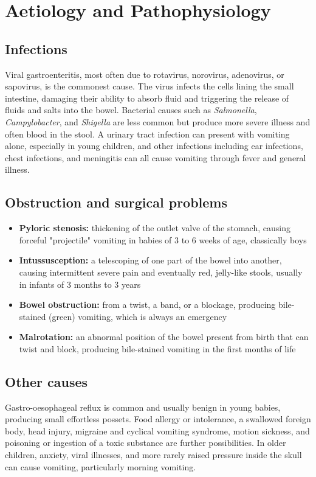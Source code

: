 \section*{Aetiology and Pathophysiology}
\subsection*{Infections}
Viral gastroenteritis, most often due to rotavirus, norovirus, adenovirus, or sapovirus, is the commonest cause. The virus infects the cells lining the small intestine, damaging their ability to absorb fluid and triggering the release of fluids and salts into the bowel. Bacterial causes such as \textit{Salmonella}, \textit{Campylobacter}, and \textit{Shigella} are less common but produce more severe illness and often blood in the stool. A urinary tract infection can present with vomiting alone, especially in young children, and other infections including ear infections, chest infections, and meningitis can all cause vomiting through fever and general illness.

\subsection*{Obstruction and surgical problems}
\begin{itemize}
    \item \textbf{Pyloric stenosis:} thickening of the outlet valve of the stomach, causing forceful "projectile" vomiting in babies of 3 to 6 weeks of age, classically boys
    \item \textbf{Intussusception:} a telescoping of one part of the bowel into another, causing intermittent severe pain and eventually red, jelly-like stools, usually in infants of 3 months to 3 years
    \item \textbf{Bowel obstruction:} from a twist, a band, or a blockage, producing bile-stained (green) vomiting, which is always an emergency
    \item \textbf{Malrotation:} an abnormal position of the bowel present from birth that can twist and block, producing bile-stained vomiting in the first months of life
\end{itemize}

\subsection*{Other causes}
Gastro-oesophageal reflux is common and usually benign in young babies, producing small effortless possets. Food allergy or intolerance, a swallowed foreign body, head injury, migraine and cyclical vomiting syndrome, motion sickness, and poisoning or ingestion of a toxic substance are further possibilities. In older children, anxiety, viral illnesses, and more rarely raised pressure inside the skull can cause vomiting, particularly morning vomiting.


